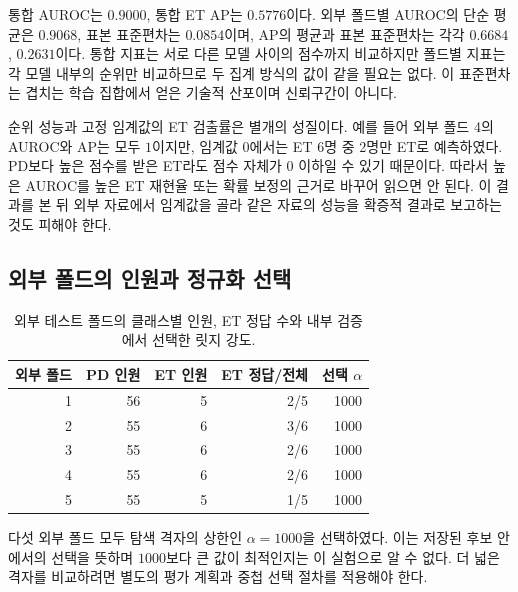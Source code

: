 \documentclass[11pt,a4paper]{article}
\numberwithin{equation}{section}
\begin{document}
통합 AUROC는 \(0.9000\), 통합 ET AP는 \(0.5776\)이다.
외부 폴드별 AUROC의 단순 평균은 \(0.9068\), 표본 표준편차는
\(0.0854\)이며, AP의 평균과 표본 표준편차는 각각
\(0.6684\), \(0.2631\)이다.
통합 지표는 서로 다른 모델 사이의 점수까지 비교하지만 폴드별 지표는
각 모델 내부의 순위만 비교하므로 두 집계 방식의 값이 같을 필요는 없다.
이 표준편차는 겹치는 학습 집합에서 얻은 기술적 산포이며 신뢰구간이 아니다.

순위 성능과 고정 임계값의 ET 검출률은 별개의 성질이다.
예를 들어 외부 폴드 4의 AUROC와 AP는 모두 \(1\)이지만,
임계값 \(0\)에서는 ET 6명 중 2명만 ET로 예측하였다.
PD보다 높은 점수를 받은 ET라도 점수 자체가 \(0\) 이하일 수 있기 때문이다.
따라서 높은 AUROC를 높은 ET 재현율 또는 확률 보정의 근거로 바꾸어 읽으면
안 된다. 이 결과를 본 뒤 외부 자료에서 임계값을 골라 같은 자료의 성능을
확증적 결과로 보고하는 것도 피해야 한다.

\clearpage
\subsection{외부 폴드의 인원과 정규화 선택}
\begin{table}[H]
\centering\small
\caption{외부 테스트 폴드의 클래스별 인원, ET 정답 수와
내부 검증에서 선택한 릿지 강도.}
\label{tab:observed-folds}
\begin{tabular}{@{}rrrrr@{}}
\toprule 외부 폴드 & PD 인원 & ET 인원 & ET 정답/전체 & 선택 \(\alpha\)\\ \midrule
1 & 56 & 5 & 2/5 & 1000\\
2 & 55 & 6 & 3/6 & 1000\\
3 & 55 & 6 & 2/6 & 1000\\
4 & 55 & 6 & 2/6 & 1000\\
5 & 55 & 5 & 1/5 & 1000\\

\bottomrule
\end{tabular}
\end{table}
다섯 외부 폴드 모두 탐색 격자의 상한인 \(\alpha=1000\)을 선택하였다.
이는 저장된 후보 안에서의 선택을 뜻하며 \(1000\)보다 큰 값이 최적인지는
이 실험으로 알 수 없다. 더 넓은 격자를 비교하려면 별도의 평가 계획과
중첩 선택 절차를 적용해야 한다.
\end{document}
